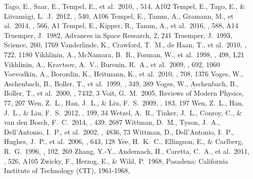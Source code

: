 \documentclass[iop, apj]{emulateapj}
\begin{document}
\begin{thebibliography}{}
 Tago, E., Saar, E., Tempel, E., et al.\ 2010, \aap, 514, A102  
 Tempel, E., Tago, E., \& Liivam{\"a}gi, L.~J.\ 2012, \aap, 540, A106 
 Tempel, E., Tamm, A., Gramann, M., et al.\ 2014, \aap, 566, A1  
 Tempel, E., Kipper, R., Tamm, A., et al.\ 2016, \aap, 588, A14  
 Truemper, J.\ 1982, Advances in Space Research, 2, 241  
 Truemper, J.\ 1993, Science, 260, 1769  
 Vanderlinde, K., Crawford, T.~M., de Haan, T., et al.\ 2010, \apj, 722, 1180   
 Vikhlinin, A., McNamara, B.~R., Forman, W., et al.\ 1998, \apjl, 498, L21
 Vikhlinin, A., Kravtsov, A.~V., Burenin, R.~A., et al.\ 2009, \apj, 692, 1060  
 Voevodkin, A., Borozdin, K., Heitmann, K., et al.\ 2010, \apj, 708, 1376  
 Voges, W., Aschenbach, B., Boller, T., et al.\ 1999, \aap, 349, 389 
 Voges, W., Aschenbach, B., Boller, T., et al.\ 2000, \iaucirc, 7432, 3  
 Voit, G.~M.\ 2005, Reviews of Modern Physics, 77, 207  
 Wen, Z.~L., Han, J.~L., \& Liu, F.~S.\ 2009, \apjs, 183, 197 
 Wen, Z.~L., Han, J.~L., \& Liu, F.~S.\ 2012, \apjs, 199, 34 
 Wetzel, A.~R., Tinker, J.~L., Conroy, C., \& van den Bosch, F.~C.\ 2014, \mnras, 439, 2687  
 Wittman, D.~M., Tyson, J.~A., Dell'Antonio, I.~P., et al.\ 2002, \procspie, 4836, 73 
 Wittman, D., Dell'Antonio, I.~P., Hughes, J.~P., et al.\ 2006, \apj, 643, 128  
 Yee, H.~K.~C., Ellingson, E., \& Carlberg, R.~G.\ 1996, \apjs, 102, 269  
 Zhang, Y.-Y., Andernach, H., Caretta, C.~A., et al.\ 2011, \aap, 526, A105 
 Zwicky, F., Herzog, E., \& Wild, P.\ 1968, Pasadena: California Institute of Technology (CIT), 1961-1968,  
\end{thebibliography}
\clearpage
\end{document}
